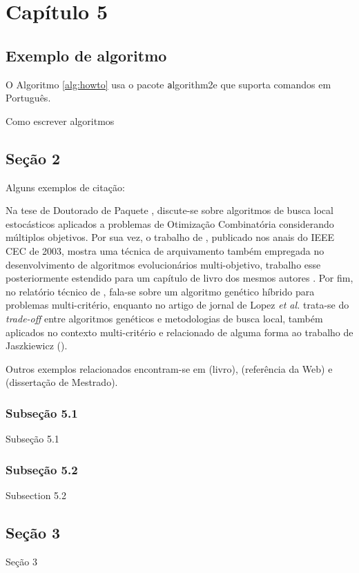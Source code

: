 \chapter{Capítulo 5}

\section{Exemplo de algoritmo}

O Algoritmo \ref{alg:howto} usa o pacote {\texttt algorithm2e} que suporta comandos em Português.

\begin{algorithm}[H]
    \SetAlgoLined
    \caption{Como escrever algoritmos}
    \label{alg:howto}
\end{algorithm}


\section{Seção 2}

Alguns exemplos de citação: 

Na tese de Doutorado de Paquete \cite{PaquetePhD}, discute-se sobre algoritmos de busca local estocásticos aplicados a problemas de Otimização Combinatória considerando múltiplos objetivos. Por sua vez, o trabalho de \cite{KnowlesBoundedLebesgue}, publicado nos anais do IEEE CEC de 2003, mostra uma técnica de arquivamento também empregada no desenvolvimento de algoritmos evolucionários multi-objetivo, trabalho esse posteriormente estendido para um capítulo de livro dos mesmos autores \cite{KnowlesBoundedPareto}. Por fim, no relatório técnico de , fala-se sobre um algoritmo genético híbrido para problemas multi-critério, enquanto no artigo de jornal de Lopez \textit{et al.} \cite{LopezPaqueteStu} trata-se do \textit{trade-off} entre algoritmos genéticos e metodologias de busca local, também aplicados no contexto multi-critério e relacionado de alguma forma ao trabalho de Jaszkiewicz (\citeyear{Jaszkiewicz}).

Outros exemplos relacionados encontram-se em \cite{Silberschatz} (livro), \cite{DB2XML} (referência da Web) e \cite{Angelo} (dissertação de Mestrado).

\subsection{Subseção 5.1}

Subseção 5.1

\subsection{Subseção 5.2}

Subsection 5.2

\section{Seção 3}

Seção 3